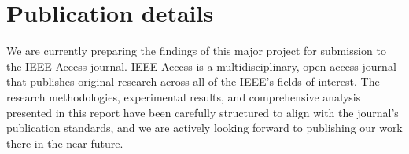\chapter{Publication details}

We are currently preparing the findings of this major project for submission to the IEEE Access journal. IEEE Access is a multidisciplinary, open-access journal that publishes original research across all of the IEEE's fields of interest. The research methodologies, experimental results, and comprehensive analysis presented in this report have been carefully structured to align with the journal's publication standards, and we are actively looking forward to publishing our work there in the near future.
